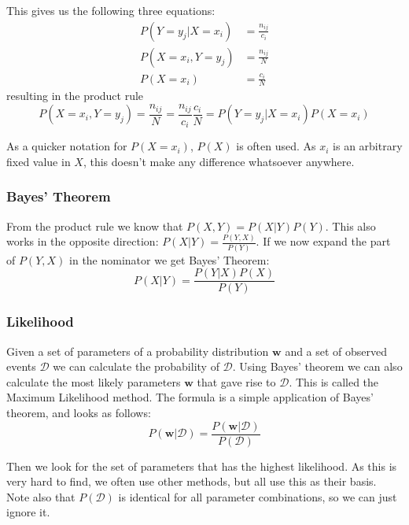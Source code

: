 \documentclass{article}
\begin{document}
This gives us the following three equations:
\begin{align}
	P(Y=y_j|X=x_i) &= \frac{n_{ij}}{c_i}\\
	P(X=x_i, Y=y_j) &= \frac{n_{ij}}{N}\\
	P(X=x_i) &= \frac{c_i}{N}
\end{align}
resulting in the product rule
\begin{equation}
	P(X=x_i, Y=y_j) = \frac{n_{ij}}{N} = \frac{n_{ij}}{c_i} \frac{c_i}{N} = P(Y=y_j | X=x_i) P(X=x_i)
\end{equation}

\begin{keypointbox}
	As a quicker notation for $P(X=x_i)$, $P(X)$ is often used.
	As $x_i$ is an arbitrary fixed value in $X$, this doesn't make any difference whatsoever anywhere.
\end{keypointbox}

\subsubsection{Bayes' Theorem}
From the product rule we know that $P(X,Y) = P(X|Y) P(Y)$.
This also works in the opposite direction: $P(X|Y) = \frac{P(Y,X)}{P(Y)}$.
If we now expand the part of $P(Y,X)$ in the nominator we get Bayes' Theorem:
\begin{equation}
	P(X|Y) = \frac{P(Y|X) P(X)}{P(Y)}
\end{equation}

\subsubsection{Likelihood}
Given a set of parameters of a probability distribution $\mathbf{w}$ and a set of observed events $\mathcal{D}$ we can calculate the probability of $\mathcal{D}$.
Using Bayes' theorem we can also calculate the most likely parameters $\mathbf{w}$ that gave rise to $\mathcal{D}$.
This is called the Maximum Likelihood method.
The formula is a simple application of Bayes' theorem, and looks as follows:
\begin{equation}
	P(\mathbf{w}|\mathcal{D}) = \frac{P(\mathbf{w} | \mathcal{D})}{P(\mathcal{D})}
\end{equation}

Then we look for the set of parameters that has the highest likelihood.
As this is very hard to find, we often use other methods, but all use this as their basis.
Note also that $P(\mathcal{D})$ is identical for all parameter combinations, so we can just ignore it.
\end{document}
